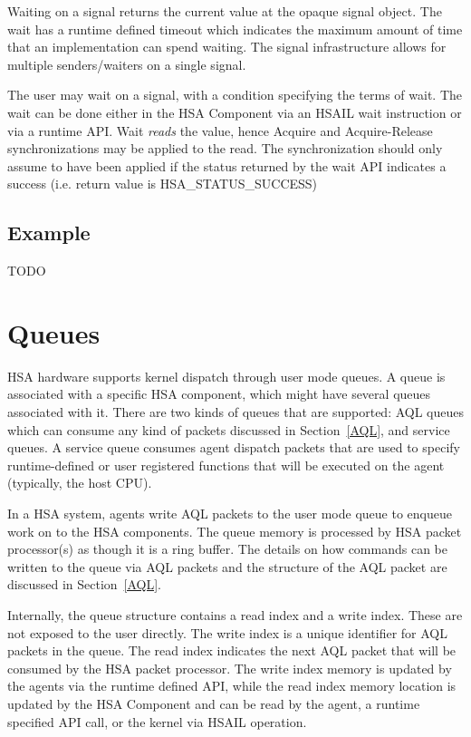 \documentclass[draft]{book}
\newcommand{\reftyp}[1]{#1}
\newcommand{\refenu}[1]{\reftyp{#1}}
\begin{document}
Waiting on a signal returns the current value at the opaque signal object. The
wait has a runtime defined timeout which indicates the maximum amount of time
that an implementation can spend waiting. The signal infrastructure allows for
multiple senders/waiters on a single signal.

The user may wait on a signal, with a condition specifying the terms of
wait. The wait can be done either in the HSA Component via an HSAIL wait
instruction or via a runtime API. Wait \emph{reads} the value, hence Acquire and
Acquire-Release synchronizations may be applied to the read. The synchronization
should only assume to have been applied if the status returned by the wait API
indicates a success (i.e. return value is \refenu{HSA_STATUS_SUCCESS})

\hypertarget{signal-example}{} \subsection{Example}
TODO

\hypertarget{architected-queue}{} \section{Queues} \label{architected-queue}

HSA hardware supports kernel dispatch through user mode queues. A queue is
associated with a specific HSA component, which might have several queues
associated with it. There are two kinds of queues that are supported: AQL queues
which can consume any kind of packets discussed in Section~\ref{AQL}, and
service queues. A service queue consumes agent dispatch packets that are used to
specify runtime-defined or user registered functions that will be executed on
the agent (typically, the host CPU).

In a HSA system, agents write AQL packets to the user mode queue to enqueue work
on to the HSA components. The queue memory is processed by HSA packet
processor(s) as though it is a ring buffer. The details on how commands can be
written to the queue via AQL packets and the structure of the AQL packet are
discussed in Section~\ref{AQL}.

Internally, the queue structure contains a read index and a write
index. These are not exposed to the user directly. The write index is a unique
identifier for AQL packets in the queue. The read index indicates the next AQL
packet that will be consumed by the HSA packet processor. The write index memory
is updated by the agents via the runtime defined API, while the read index
memory location is updated by the HSA Component and can be read by the agent, a
runtime specified API call, or the kernel via HSAIL operation.
\end{document}
